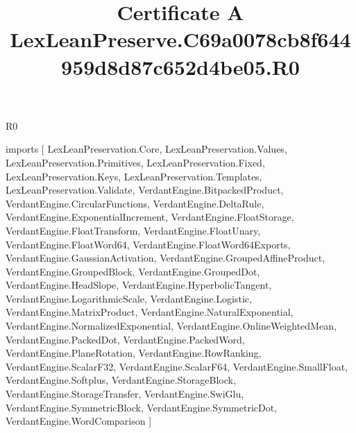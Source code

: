 \begin{lexlean}{R0}
\title{Certificate A LexLeanPreserve.C69a0078cb8f644959d8d87c652d4be05.R0}
\begin{coremodule}
imports [
  LexLeanPreservation.Core,
  LexLeanPreservation.Values,
  LexLeanPreservation.Primitives,
  LexLeanPreservation.Fixed,
  LexLeanPreservation.Keys,
  LexLeanPreservation.Templates,
  LexLeanPreservation.Validate,
  VerdantEngine.BitpackedProduct,
  VerdantEngine.CircularFunctions,
  VerdantEngine.DeltaRule,
  VerdantEngine.ExponentialIncrement,
  VerdantEngine.FloatStorage,
  VerdantEngine.FloatTransform,
  VerdantEngine.FloatUnary,
  VerdantEngine.FloatWord64,
  VerdantEngine.FloatWord64Exports,
  VerdantEngine.GaussianActivation,
  VerdantEngine.GroupedAffineProduct,
  VerdantEngine.GroupedBlock,
  VerdantEngine.GroupedDot,
  VerdantEngine.HeadSlope,
  VerdantEngine.HyperbolicTangent,
  VerdantEngine.LogarithmicScale,
  VerdantEngine.Logistic,
  VerdantEngine.MatrixProduct,
  VerdantEngine.NaturalExponential,
  VerdantEngine.NormalizedExponential,
  VerdantEngine.OnlineWeightedMean,
  VerdantEngine.PackedDot,
  VerdantEngine.PackedWord,
  VerdantEngine.PlaneRotation,
  VerdantEngine.RowRanking,
  VerdantEngine.ScalarF32,
  VerdantEngine.ScalarF64,
  VerdantEngine.SmallFloat,
  VerdantEngine.Softplus,
  VerdantEngine.StorageBlock,
  VerdantEngine.StorageTransfer,
  VerdantEngine.SwiGlu,
  VerdantEngine.SymmetricBlock,
  VerdantEngine.SymmetricDot,
  VerdantEngine.WordComparison
]


\end{coremodule}
\end{lexlean}
